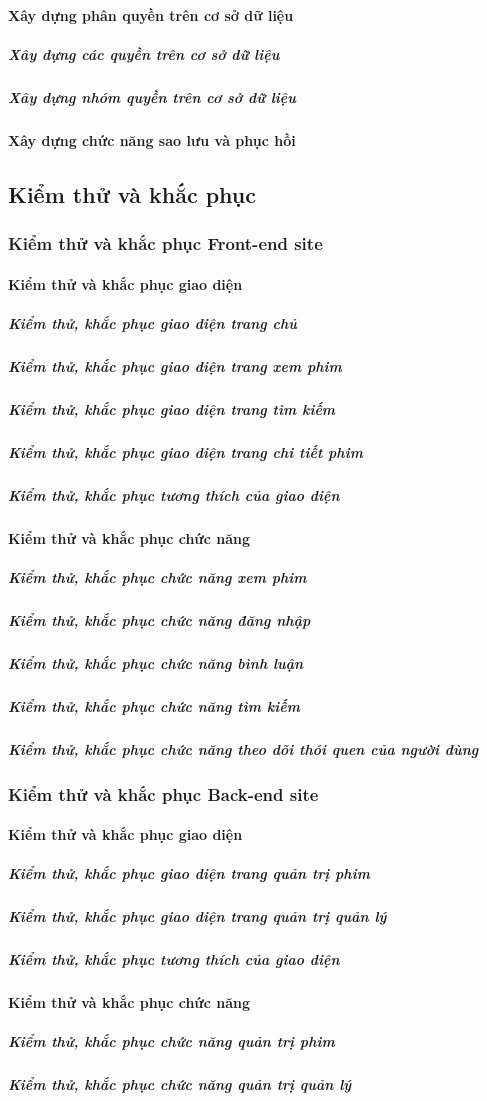 \documentclass[a4paper]{book}
\begin{document}
\paragraph{Xây dựng phân quyền trên cơ sở dữ liệu}
\subparagraph{Xây dựng các quyền trên cơ sở dữ liệu}
\subparagraph{Xây dựng nhóm quyền trên cơ sở dữ liệu}
\paragraph{Xây dựng chức năng sao lưu và phục hồi}
\subsection{Kiểm thử và khắc phục}
\subsubsection{Kiểm thử và khắc phục Front-end site}
\paragraph{Kiểm thử và khắc phục giao diện}
\subparagraph{Kiểm thử, khắc phục giao diện trang chủ}
\subparagraph{Kiểm thử, khắc phục giao diện trang xem phim}
\subparagraph{Kiểm thử, khắc phục giao diện trang tìm kiếm}
\subparagraph{Kiểm thử, khắc phục giao diện trang chi tiết phim}
\subparagraph{Kiểm thử, khắc phục tương thích của giao diện}
\paragraph{Kiểm thử và khắc phục chức năng}
\subparagraph{Kiểm thử, khắc phục chức năng xem phim}
\subparagraph{Kiểm thử, khắc phục chức năng đăng nhập}
\subparagraph{Kiểm thử, khắc phục chức năng bình luận}
\subparagraph{Kiểm thử, khắc phục chức năng tìm kiếm}
\subparagraph{Kiểm thử, khắc phục chức năng theo dõi thói quen của người dùng}
\subsubsection{Kiểm thử và khắc phục Back-end site}
\paragraph{Kiểm thử và khắc phục giao diện}
\subparagraph{Kiểm thử, khắc phục giao diện trang quản trị phim}
\subparagraph{Kiểm thử, khắc phục giao diện trang quản trị quản lý}
\subparagraph{Kiểm thử, khắc phục tương thích của giao diện}
\paragraph{Kiểm thử và khắc phục chức năng}
\subparagraph{Kiểm thử, khắc phục chức năng quản trị phim}
\subparagraph{Kiểm thử, khắc phục chức năng quản trị quản lý}
\end{document}

